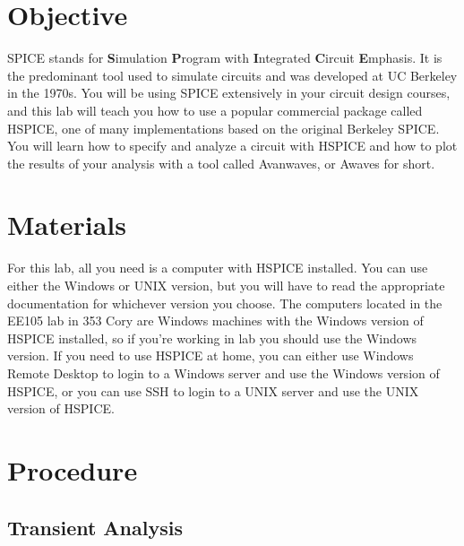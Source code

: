 \documentclass{article}
\begin{document}
\thispagestyle{plain}


\section{Objective}
SPICE stands for \textbf{S}imulation \textbf{P}rogram with \textbf{I}ntegrated \textbf{C}ircuit \textbf{E}mphasis. It is the predominant tool used to simulate circuits and was developed at UC Berkeley in the 1970s. You will be using SPICE extensively in your circuit design courses, and this lab will teach you how to use a popular commercial package called HSPICE, one of many implementations based on the original Berkeley SPICE. You will learn how to specify and analyze a circuit with HSPICE and how to plot the results of your analysis with a tool called Avanwaves, or Awaves for short.

\section{Materials}
For this lab, all you need is a computer with HSPICE installed. You can use either the Windows or UNIX version, but you will have to read the appropriate documentation for whichever version you choose. The computers located in the EE105 lab in 353 Cory are Windows machines with the Windows version of HSPICE installed, so if you're working in lab you should use the Windows version. If you need to use HSPICE at home, you can either use Windows Remote Desktop to login to a Windows server and use the Windows version of HSPICE, or you can use SSH to login to a UNIX server and use the UNIX version of HSPICE.

\section{Procedure}

\subsection{Transient Analysis}
\end{document}
